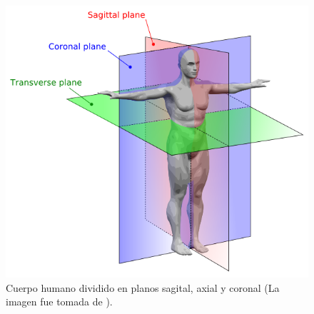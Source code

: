 \begin{figure}[htp]
 \centering
  \includegraphics[scale=0.4]{img/cap01/HumanAnatomyPlanes}
  \caption[Cuerpo humano dividido en planos sagital, axial y coronal (La imagen fue tomada de \cite{wikiImagen})]{Cuerpo humano dividido en planos sagital, axial y coronal (La imagen fue tomada de \cite{wikiImagen}).}
  \label{fig:cortesHB}
\end{figure}

